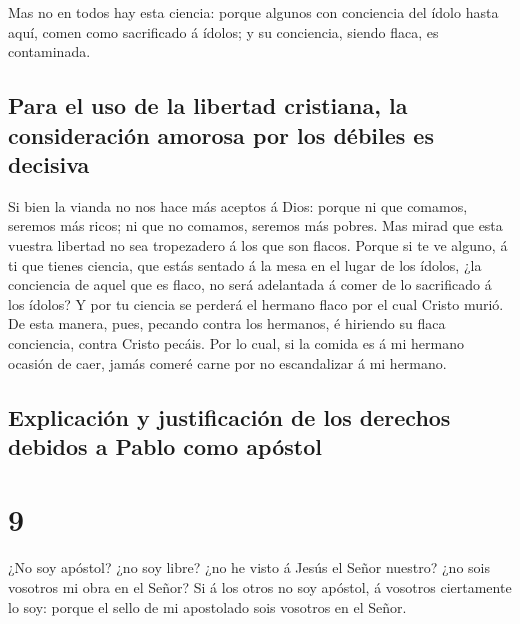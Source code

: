  Mas no en todos hay esta ciencia: porque algunos con
conciencia del ídolo hasta aquí, comen como sacrificado á ídolos; y su
conciencia, siendo flaca, es contaminada.

\hypertarget{para-el-uso-de-la-libertad-cristiana-la-consideraciuxf3n-amorosa-por-los-duxe9biles-es-decisiva}{%
\subsection{Para el uso de la libertad cristiana, la consideración
amorosa por los débiles es
decisiva}\label{para-el-uso-de-la-libertad-cristiana-la-consideraciuxf3n-amorosa-por-los-duxe9biles-es-decisiva}}

 Si bien la vianda no nos hace más aceptos á Dios: porque
ni que comamos, seremos más ricos; ni que no comamos, seremos más
pobres.  Mas mirad que esta vuestra libertad no sea
tropezadero á los que son flacos.  Porque si te ve
alguno, á ti que tienes ciencia, que estás sentado á la mesa en el lugar
de los ídolos, ¿la conciencia de aquel que es flaco, no será adelantada
á comer de lo sacrificado á los ídolos?  Y por tu ciencia
se perderá el hermano flaco por el cual Cristo murió.  De
esta manera, pues, pecando contra los hermanos, é hiriendo su flaca
conciencia, contra Cristo pecáis.  Por lo cual, si la
comida es á mi hermano ocasión de caer, jamás comeré carne por no
escandalizar á mi hermano.

\hypertarget{explicaciuxf3n-y-justificaciuxf3n-de-los-derechos-debidos-a-pablo-como-apuxf3stol}{%
\subsection{Explicación y justificación de los derechos debidos a Pablo
como
apóstol}\label{explicaciuxf3n-y-justificaciuxf3n-de-los-derechos-debidos-a-pablo-como-apuxf3stol}}

\hypertarget{section-46-9}{%
\section{9}\label{section-46-9}}

 ¿No soy apóstol? ¿no soy libre? ¿no he visto á Jesús el
Señor nuestro? ¿no sois vosotros mi obra en el Señor?  Si
á los otros no soy apóstol, á vosotros ciertamente lo soy: porque el
sello de mi apostolado sois vosotros en el Señor.

